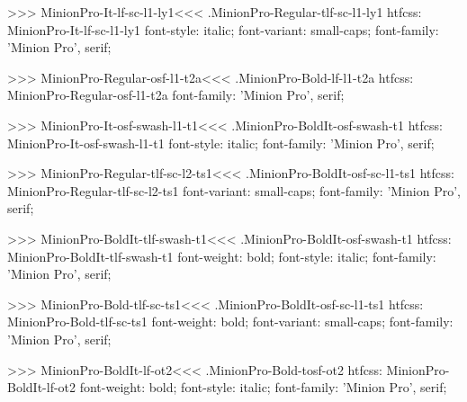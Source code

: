 {>>>
\<MinionPro-It-lf-sc-l1-ly1\><<<
.MinionPro-Regular-tlf-sc-l1-ly1
htfcss:  MinionPro-It-lf-sc-l1-ly1  font-style: italic; font-variant: small-caps; font-family: 'Minion Pro', serif;

>>>
\<MinionPro-Regular-osf-l1-t2a\><<<
.MinionPro-Bold-lf-l1-t2a
htfcss:  MinionPro-Regular-osf-l1-t2a  font-family: 'Minion Pro', serif;

>>>
\<MinionPro-It-osf-swash-l1-t1\><<<
.MinionPro-BoldIt-osf-swash-t1
htfcss:  MinionPro-It-osf-swash-l1-t1  font-style: italic; font-family: 'Minion Pro', serif;

>>>
\<MinionPro-Regular-tlf-sc-l2-ts1\><<<
.MinionPro-BoldIt-osf-sc-l1-ts1
htfcss:  MinionPro-Regular-tlf-sc-l2-ts1  font-variant: small-caps; font-family: 'Minion Pro', serif;

>>>
\<MinionPro-BoldIt-tlf-swash-t1\><<<
.MinionPro-BoldIt-osf-swash-t1
htfcss:  MinionPro-BoldIt-tlf-swash-t1  font-weight: bold; font-style: italic; font-family: 'Minion Pro', serif;

>>>
\<MinionPro-Bold-tlf-sc-ts1\><<<
.MinionPro-BoldIt-osf-sc-l1-ts1
htfcss:  MinionPro-Bold-tlf-sc-ts1  font-weight: bold; font-variant: small-caps; font-family: 'Minion Pro', serif;

>>>
\<MinionPro-BoldIt-lf-ot2\><<<
.MinionPro-Bold-tosf-ot2
htfcss:  MinionPro-BoldIt-lf-ot2  font-weight: bold; font-style: italic; font-family: 'Minion Pro', serif;

}
